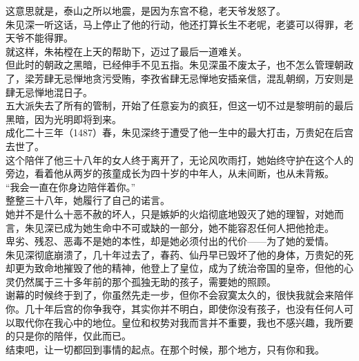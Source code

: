 \begin{multicols}{\theparacolNo}
这意思就是，泰山之所以地震，是因为东宫不稳，老天爷发怒了。\\

朱见深一听这话，马上停止了他的行动，他还打算长生不老呢，老婆可以得罪，老天爷不能得罪。\\

就这样，朱祐樘在上天的帮助下，迈过了最后一道难关。\\

但此时的朝政之黑暗，已经伸手不见五指。朱见深虽不废太子，也不怎么管理朝政了，梁芳肆无忌惮地贪污受贿，李孜省肆无忌惮地安插亲信，混乱朝纲，万安则是肆无忌惮地混日子。\\

五大派失去了所有的管制，开始了任意妄为的疯狂，但这一切不过是黎明前的最后黑暗，因为光明即将到来。\\

成化二十三年（1487）春，朱见深终于遭受了他一生中的最大打击，万贵妃在后宫去世了。\\

这个陪伴了他三十八年的女人终于离开了，无论风吹雨打，她始终守护在这个人的旁边，看着他从两岁的孩童成长为四十岁的中年人，从未间断，也从未背叛。\\

“我会一直在你身边陪伴着你。”\\

整整三十八年，她履行了自己的诺言。\\

她并不是什么十恶不赦的坏人，只是嫉妒的火焰彻底地毁灭了她的理智，对她而言，朱见深已成为她生命中不可或缺的一部分，她不能容忍任何人把他抢走。\\

卑劣、残忍、恶毒不是她的本性，却是她必须付出的代价——为了她的爱情。\\

朱见深彻底崩溃了，几十年过去了，春药、仙丹早已毁坏了他的身体，万贵妃的死却更为致命地摧毁了他的精神，他登上了皇位，成为了统治帝国的皇帝，但他的心灵仍然属于三十多年前的那个孤独无助的孩子，需要她的照顾。\\

谢幕的时候终于到了，你虽然先走一步，但你不会寂寞太久的，很快我就会来陪伴你。几十年后宫的你争我夺，其实你并不明白，即使你没有孩子，也没有任何人可以取代你在我心中的地位。皇位和权势对我而言并不重要，我也不感兴趣，我所要的只是你的陪伴，仅此而已。\\

结束吧，让一切都回到事情的起点。在那个时候，那个地方，只有你和我。\\


\end{multicols}
